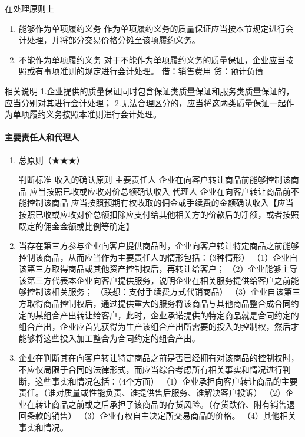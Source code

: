 \documentclass[UTF8,12pt]{ctexart}
\numberwithin{equation}{section} %
\numberwithin{figure}{section}
\numberwithin{table}{section}
\begin{document}
	在处理原则上
	\begin{enumerate}
		\item 能够作为单项履约义务	
		作为单项履约义务的质量保证应当按本节规定进行会计处理，并将部分交易价格分摊至该项履约义务。
		
		\item 不能作为单项履约义务	
		对于不能作为单项履约义务的质量保证，企业应当按照或有事项准则的规定进行会计处理。
		借：销售费用
		贷：预计负债
	\end{enumerate}	
	
	
	相关说明
	1.企业提供的质量保证同时包含保证类质量保证和服务类质量保证的，应当分别对其进行会计处理；
	2.无法合理区分的，应当将这两类质量保证一起作为单项履约义务按照本准则进行会计处理。
	
	\paragraph{主要责任人和代理人}
	\begin{enumerate}
		\item 总原则（★★★）
		
		判断标准	收入的确认原则
		主要责任人	企业在向客户转让商品前能够控制该商品	应当按照已收或应收对价总额确认收入
		代理人	企业在向客户转让商品前不能控制该商品	应当按照预期有权收取的佣金或手续费的金额确认收入【应当按照已收或应收对价总额扣除应支付给其他相关方的价款后的净额，或者按照既定的佣金金额或比例等确定】
		
		\item 当存在第三方参与企业向客户提供商品时，企业向客户转让特定商品之前能够控制该商品，从而应当作为主要责任人的情形包括：（3种情形）
		（1）企业自该第三方取得商品或其他资产控制权后，再转让给客户；
		（2）企业能够主导该第三方代表本企业向客户提供服务，说明企业在相关服务提供给客户之前能够控制该相关服务； （联想：支付手续费方式代销商品）
		（3）企业自该第三方取得商品控制权后，通过提供重大的服务将该商品与其他商品整合成合同约定的某组合产出转让给客户，此时，企业承诺提供的特定商品就是合同约定的组合产出，企业应首先获得为生产该组合产出所需要的投入的控制权，然后才能够将这些投入加工整合为合同约定的组合产出。
		
		\item 企业在判断其在向客户转让特定商品之前是否已经拥有对该商品的控制权时，不应仅局限于合同的法律形式，而应当综合考虑所有相关事实和情况进行判断，这些事实和情况包括：（4个方面）
		（1）企业承担向客户转让商品的主要责任。（谁对质量或性能负责、谁提供售后服务、谁解决客户投诉）
		（2）企业在转让商品之前或之后承担了该商品的存货风险。（存货跌价、附有销售退回条款的销售）
		（3）企业有权自主决定所交易商品的价格。
		（4）其他相关事实和情况。
	\end{enumerate}
\end{document}
